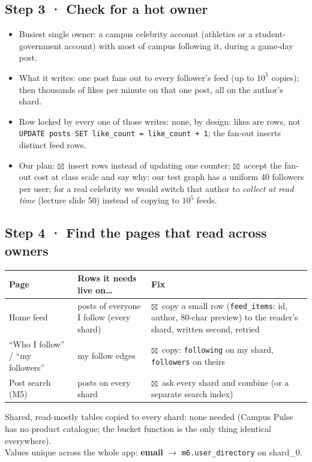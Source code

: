 \subsection*{Step 3 · Check for a hot owner}
\begin{itemize}[nosep,leftmargin=1.2em]
\item Busiest single owner: a campus celebrity account (athletics or a student-government account) with
      most of campus following it, during a game-day post.
\item What it writes: one post fans out to every follower's feed (up to $10^5$ copies); then thousands of
      likes per minute on that one post, all on the author's shard.
\item Row locked by every one of those writes: none, by design: likes are rows, not
      \texttt{UPDATE posts SET like\_count = like\_count + 1}; the fan-out inserts distinct feed rows.
\item Our plan: $\boxtimes$~insert rows instead of updating one counter;
      $\boxtimes$~accept the fan-out cost at class scale and say why: our test graph has a uniform 40
      followers per user; for a real celebrity we would switch that author to \emph{collect at read time}
      (lecture slide 50) instead of copying to $10^5$ feeds.
\end{itemize}

\subsection*{Step 4 · Find the pages that read across owners}
\begin{center}\small
\begin{tabularx}{\linewidth}{@{}>{\raggedright}p{3.2cm}>{\raggedright}X>{\raggedright\arraybackslash}p{4.6cm}@{}}
\toprule
Page & Rows it needs live on\dots & Fix \\
\midrule
Home feed & posts of everyone I follow (every shard) & $\boxtimes$~copy a small row (\texttt{feed\_items}: id, author, 80-char preview) to the reader's shard, written second, retried \\
``Who I follow'' / ``my followers'' & my follow edges & $\boxtimes$~copy: \texttt{following} on my shard, \texttt{followers} on theirs \\
Post search (M5) & posts on every shard & $\boxtimes$~ask every shard and combine (or a separate search index) \\
\bottomrule
\end{tabularx}
\end{center}
Shared, read-mostly tables copied to every shard: none needed (Campus Pulse has no product catalogue;
the bucket function is the only thing identical everywhere).\\
Values unique across the whole app: \textbf{email} $\rightarrow$ \texttt{m6.user\_directory} on shard\_0.

